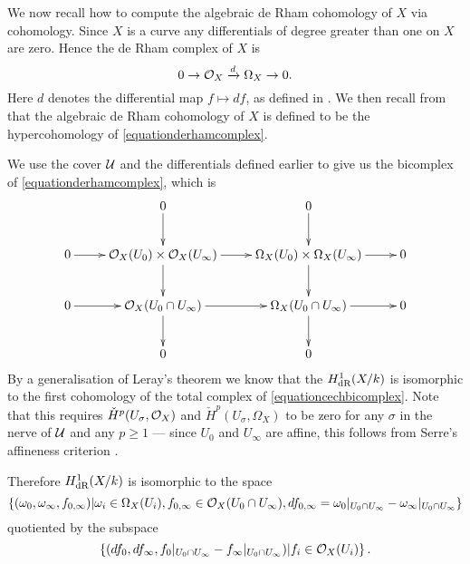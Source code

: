 We now recall how to compute the algebraic de Rham cohomology of $X$ via \cech cohomology.
Since $X$ is a curve any differentials of degree greater than one on $X$ are zero.
Hence the de Rham complex of $X$ is 
    \begin{equation}\label{equationderhamcomplex}
    0 \rightarrow {\cal O}_X \xrightarrow{d} \Omega_X \rightarrow 0.
    \end{equation}
Here $d$ denotes the differential map $f \mapsto df$, as defined in \cite[Chap.\ II, Pg.\ 172]{hart}.
We then recall from \cite[Pg.\ 351]{grothendiecklettertoatiyah} that the algebraic de Rham cohomology of $X$ is defined to be the hypercohomology of \eqref{equationderhamcomplex}.

We use the cover $\cal U$ and the \cech differentials defined earlier to give us the \cech bicomplex of \eqref{equationderhamcomplex}, which is
    \begin{equation}\label{equationcechbicomplex}
    \xymatrix{ & 0 \ar[d] & 0 \ar[d] & \\
    0 \ar[r] & \cO_X(U_0) \times \cO_X(U_\infty) \ar[d] \ar[r] & \Omega_X(U_0) \times \Omega_X(U_\infty) \ar[d] \ar[r] & 0 \\
    0 \ar[r] & \cO_X(U_0\cap U_\infty) \ar[d] \ar[r] & \Omega_X(U_0 \cap U_\infty) \ar[r] \ar[d] & 0 \\
    & 0 & 0 &}
    \end{equation}
By a generalisation of Leray's theorem \cite[Cor.\ 12.4.7]{EGA0III} we know that the $H_{\text {dR}}^1(X/k)$ is isomorphic to the first cohomology of the total complex of \eqref{equationcechbicomplex}.
Note that this requires ${\check H}^p(U_\sigma, {\cal O}_X)$ and ${\check H}^p(U_\sigma, \Omega_X)$ to be zero for any $\sigma$ in the nerve of ${\mathcal U}$ and any $p \geq 1$ --- since $U_0$ and $U_\infty$ are affine, this follows from Serre's affineness criterion \cite[Thm.\ 5.2.23]{liu}.

Therefore $H_{\text {dR}}^1(X/k)$ is isomorphic to the space
    \begin{equation}\label{equationderhamspace}
    \left\{(\omega_0, \omega_\infty, f_{0,\infty}) | \omega_i\in \Omega_X(U_i), f_{0,\infty}\in {\cal O}_X(U_0 \cap U_\infty), df_{0,\infty} = \omega_0|_{U_0\cap U_\infty} - \omega_\infty|_{U_0\cap U_\infty} \right\}
    \end{equation}
quotiented by the subspace
    \begin{equation}\label{equationderhamquotient}
    \left\{  (df_0, df_\infty, f_0|_{U_0\cap U_\infty} -f_\infty|_{U_0\cap U_\infty} )|f_i \in {\cal O}_X(U_i)\right\}.
    \end{equation}

